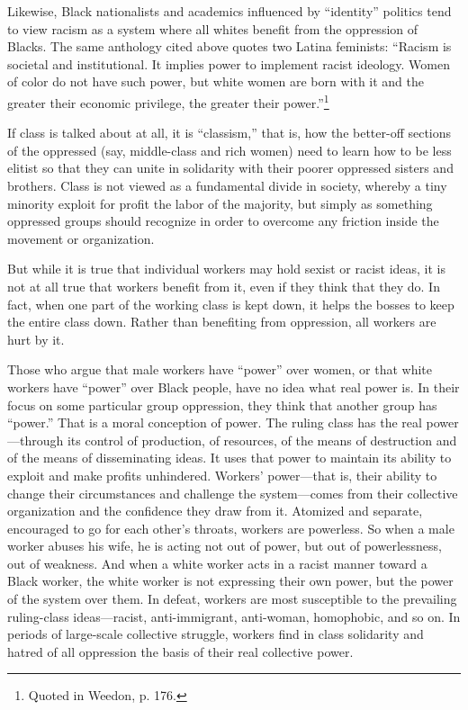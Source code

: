 Likewise, Black nationalists and academics influenced by ``identity'' politics tend to view racism as a system where all whites benefit from the oppression of Blacks. The same anthology cited above quotes two Latina feminists: ``Racism is societal and institutional. It implies power to implement racist ideology. Women of color do not have such power, but white women are born with it and the greater their economic privilege, the greater their power.''\footnote{Quoted in Weedon, p. 176.}

If class is talked about at all, it is ``classism,'' that is, how the better-off sections of the oppressed (say, middle-class and rich women) need to learn how to be less elitist so that they can unite in solidarity with their poorer oppressed sisters and brothers. Class is not viewed as a fundamental divide in society, whereby a tiny minority exploit for profit the labor of the majority, but simply as something oppressed groups should recognize in order to overcome any friction inside the movement or organization.

But while it is true that individual workers may hold sexist or racist ideas, it is not at all true that workers benefit from it, even if they think that they do. In fact, when one part of the working class is kept down, it helps the bosses to keep the entire class down. Rather than benefiting from oppression, all workers are hurt by it.

Those who argue that male workers have ``power'' over women, or that white workers have ``power'' over Black people, have no idea what real power is. In their focus on some particular group oppression, they think that another group has ``power.'' That is a moral conception of power. The ruling class has the real power---through its control of production, of resources, of the means of destruction and of the means of disseminating ideas. It uses that power to maintain its ability to exploit and make profits unhindered. Workers' power---that is, their ability to change their circumstances and challenge the system---comes from their collective organization and the confidence they draw from it. Atomized and separate, encouraged to go for each other's throats, workers are powerless. So when a male worker abuses his wife, he is acting not out of power, but out of powerlessness, out of weakness. And when a white worker acts in a racist manner toward a Black worker, the white worker is not expressing their own power, but the power of the system over them. In defeat, workers are most susceptible to the prevailing ruling-class ideas---racist, anti-immigrant, anti-woman, homophobic, and so on. In periods of large-scale collective struggle, workers find in class solidarity and hatred of all oppression the basis of their real collective power.

